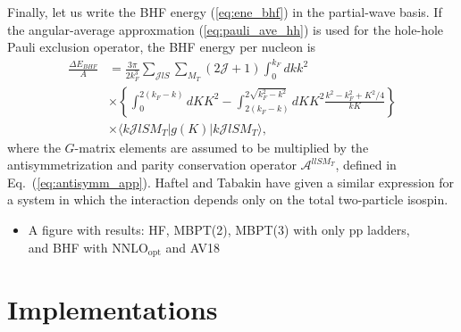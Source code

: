 \documentclass[a4paper,12pt]{report}
\begin{document}

Finally, let us write the BHF energy (\ref{eq:ene_bhf}) in the partial-wave basis. If the angular-average approxmation (\ref{eq:pauli_ave_hh}) is used for the hole-hole Pauli exclusion operator, the BHF energy per nucleon is
\begin{align}
  \frac{\Delta E_{BHF}}{A} &= \frac{3\pi }{2k_{F}^{3}}\sum_{\mathcal{J}lS}\sum_{M_{T}}(2\mathcal{J}+1)\int_{0}^{k_{F}}dk k^{2} \nonumber \\
  & \times \left\{ \int_{0}^{2(k_{F}-k)}dK K^{2} - \int_{2(k_{F}-k)}^{2\sqrt{k_{F}^{2}-k^{2}}}dK K^{2}\frac{k^{2}-k_{F}^{2}+K^{2}/4}{kK} \right\} \nonumber \\
  & \times \langle k\mathcal{J}lSM_{T}|g(K)|k\mathcal{J}lSM_{T}\rangle ,
\end{align} 
where the $G$-matrix elements are assumed to be multiplied by the 
antisymmetrization and parity conservation operator 
$\mathcal{A}^{llSM_{T}}$, defined in Eq.~(\ref{eq:antisymm_app}). 
Haftel and Tabakin \cite{haftel_tabakin} have given
a similar expression for a system in which the interaction depends only
on the total two-particle isospin.

\begin{itemize}
\item A figure with results: HF, MBPT(2), MBPT(3) with only pp ladders, \\
  and BHF with NNLO$_{\text{opt}}$ and AV18 
\end{itemize}

\section{Implementations}
\end{document}
